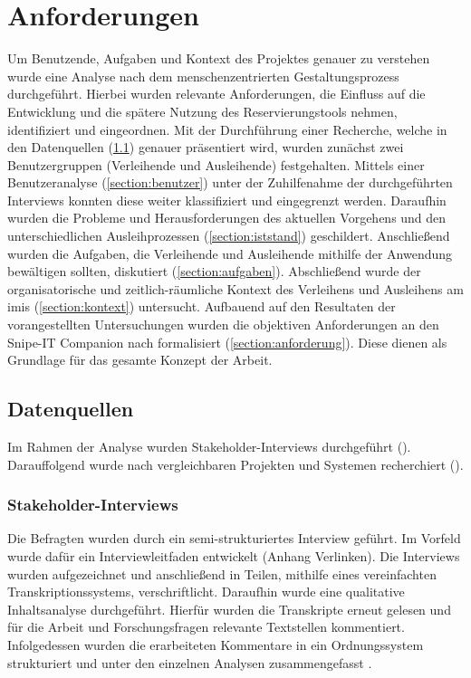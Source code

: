 \chapter{Anforderungen}
\label{chapter-analyse}

Um Benutzende, Aufgaben und Kontext des Projektes genauer zu verstehen wurde
eine Analyse nach dem menschenzentrierten Gestaltungsprozess durchgeführt.
Hierbei wurden relevante Anforderungen, die Einfluss auf die Entwicklung und die
spätere Nutzung des Reservierungstools nehmen, identifiziert und eingeordnen.
Mit der Durchführung einer Recherche, welche in den Datenquellen
(\ref{section:daten}) genauer präsentiert wird, wurden zunächst zwei
Benutzergruppen (Verleihende und Ausleihende) festgehalten. Mittels einer
Benutzeranalyse (\ref{section:benutzer}) unter der Zuhilfenahme der
durchgeführten Interviews konnten diese weiter klassifiziert und eingegrenzt
werden. Daraufhin wurden die Probleme und Herausforderungen des aktuellen
Vorgehens und den unterschiedlichen Ausleihprozessen (\ref{section:iststand})
geschildert. Anschließend wurden die Aufgaben, die Verleihende und Ausleihende
mithilfe der Anwendung bewältigen sollten, diskutiert (\ref{section:aufgaben}).
Abschließend wurde der organisatorische und zeitlich-räumliche Kontext des
Verleihens und Ausleihens am \ac{imis} (\ref{section:kontext}) untersucht.
Aufbauend auf den Resultaten der vorangestellten Untersuchungen wurden die
objektiven Anforderungen an den Snipe-IT Companion nach 
formalisiert (\ref{section:anforderung}). Diese dienen als Grundlage für das gesamte
Konzept der Arbeit.

\section{Datenquellen}
\label{section:daten}
Im Rahmen der Analyse wurden Stakeholder-Interviews durchgeführt ().
Darauffolgend wurde nach vergleichbaren Projekten und Systemen recherchiert
().

\subsection{Stakeholder-Interviews}
\label{subsection:interview}
Die Befragten wurden durch ein semi-strukturiertes Interview geführt. Im Vorfeld wurde dafür ein
Interviewleitfaden entwickelt (Anhang Verlinken). Die Interviews wurden aufgezeichnet und
anschließend in Teilen, mithilfe eines vereinfachten Transkriptionssystems, verschriftlicht.
Daraufhin wurde eine qualitative Inhaltsanalyse durchgeführt. Hierfür wurden die Transkripte erneut
gelesen und für die Arbeit und Forschungsfragen relevante Textstellen kommentiert. Infolgedessen
wurden die erarbeiteten Kommentare in ein Ordnungssystem strukturiert und unter den einzelnen
Analysen zusammengefasst \cite{dresing_praxisbuch_2016}.

